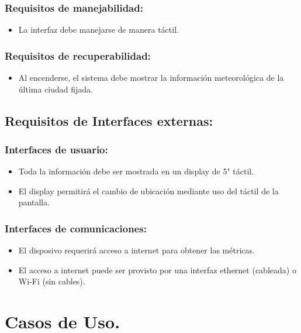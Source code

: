 \subsubsection{Requisitos de manejabilidad:}
\begin{itemize}
    \item La interfaz debe manejarse de manera táctil.
\end{itemize}

\subsubsection{Requisitos de recuperabilidad:}
\begin{itemize}
    \item Al encenderse, el sistema debe mostrar la información meteorológica de la
    última ciudad fijada.
\end{itemize}

\subsection{Requisitos de Interfaces externas:}

\subsubsection{Interfaces de usuario:}
\begin{itemize}
    \item Toda la información debe ser mostrada en un display de 5" táctil.
    \item El display permitirá el cambio de ubicación mediante uso del táctil de la pantalla.
\end{itemize}

\subsubsection{Interfaces de comunicaciones:}
\begin{itemize}
    \item El disposivo requerirá acceso a internet para obtener las métricas.
    \item El acceso a internet puede ser provisto por una interfaz ethernet (cableada)
    o Wi-Fi (sin cables).
\end{itemize}

\section{Casos de Uso.}

